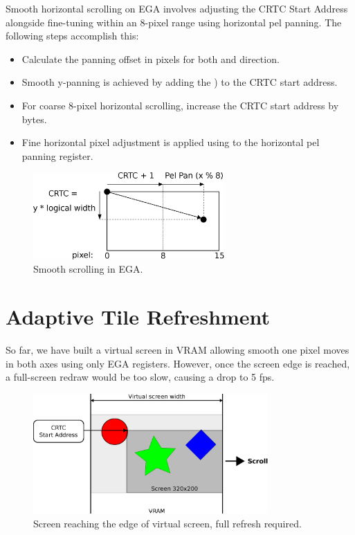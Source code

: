 \documentclass[book.tex]{subfiles}
\begin{document}
\begin{minipage}{\textwidth}
  
  \end{minipage}
  \label{ega_pel_pan}
 
\par
Smooth horizontal scrolling on EGA involves adjusting the CRTC Start Address alongside fine-tuning within an 8-pixel range using horizontal pel panning. The following steps accomplish this:
\begin{itemize}
  \item Calculate the panning offset in pixels for both  and direction.
  \item Smooth y-panning is achieved by adding the ) to the CRTC start address.
  \item For coarse 8-pixel horizontal scrolling, increase the CRTC start address by  bytes.
  \item Fine horizontal pixel adjustment is applied using  to the horizontal pel panning register.
\end{itemize}


\begin{figure}[H]
\centering
\includegraphics[width=0.65\textwidth]{imgs/drawings/Tile_Refresh.eps}
\caption{Smooth scrolling in EGA.}
\label{fig:tile_refresh}
\end{figure}


\section{Adaptive Tile Refreshment}
So far, we have built a virtual screen in VRAM allowing smooth one pixel moves in both axes using only EGA registers. However, once the screen edge is reached, a full-screen redraw would be too slow, causing a drop to 5 fps.\\


\begin{figure}[H]
\centering
\includegraphics[width=0.8\textwidth]{imgs/drawings/screen_edge.eps}
\caption{Screen reaching the edge of virtual screen, full refresh required.}
\label{fig:screen_edge}
\end{figure}
\end{document}
